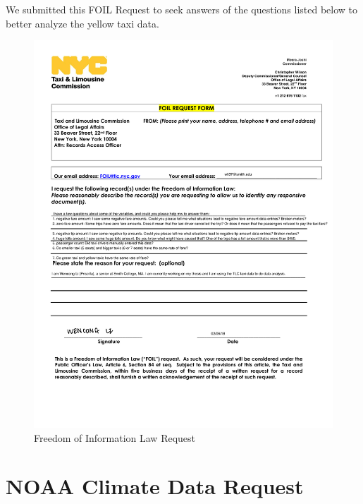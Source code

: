 \documentclass[12pt,twoside]{reedthesis}
\theoremstyle{definition}
\theoremstyle{definition}
\theoremstyle{definition}
\theoremstyle{remark}
\begin{document}
We submitted this FOIL Request to seek answers of the questions listed
below to better analyze the yellow taxi data.
\begin{figure}[h]

{\centering \includegraphics[width=6.38in]{figure/appendix_foil_form_doc} 

}

\caption{Freedom of Information Law Request}\label{fig:foil}
\end{figure}
\chapter{NOAA Climate Data Request}\label{noaa-climate-data-request}
\end{document}

